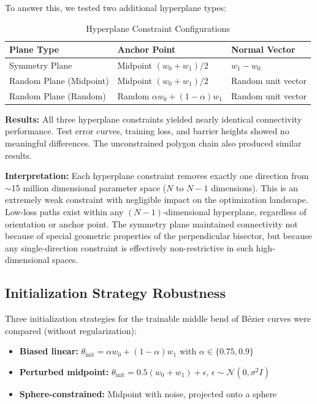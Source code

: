 \documentclass[11pt,a4paper]{article}
\begin{document}
To answer this, we tested two additional hyperplane types:

\begin{table}[H]
\centering
\caption{Hyperplane Constraint Configurations}
\begin{tabular}{lll}
\toprule
\textbf{Plane Type} & \textbf{Anchor Point} & \textbf{Normal Vector} \\
\midrule
Symmetry Plane & Midpoint $(w_0+w_1)/2$ & $w_1-w_0$ \\
Random Plane (Midpoint) & Midpoint $(w_0+w_1)/2$ & Random unit vector \\
Random Plane (Random) & Random $\alpha w_0+(1-\alpha)w_1$ & Random unit vector \\
\bottomrule
\end{tabular}
\end{table}

\textbf{Results:} All three hyperplane constraints yielded nearly identical connectivity performance. Test error curves, training loss, and barrier heights showed no meaningful differences. The unconstrained polygon chain also produced similar results.

\textbf{Interpretation:} Each hyperplane constraint removes exactly one direction from $\sim$15 million dimensional parameter space ($N$ to $N-1$ dimensions). This is an extremely weak constraint with negligible impact on the optimization landscape. Low-loss paths exist within any $(N-1)$-dimensional hyperplane, regardless of orientation or anchor point. The symmetry plane maintained connectivity not because of special geometric properties of the perpendicular bisector, but because any single-direction constraint is effectively non-restrictive in such high-dimensional spaces.

\subsection{Initialization Strategy Robustness}

Three initialization strategies for the trainable middle bend of B\'{e}zier curves were compared (without regularization):

\begin{itemize}
    \item \textbf{Biased linear:} $\theta_{\text{init}} = \alpha w_0 + (1-\alpha) w_1$ with $\alpha \in \{0.75, 0.9\}$
    \item \textbf{Perturbed midpoint:} $\theta_{\text{init}} = 0.5(w_0 + w_1) + \epsilon$, $\epsilon \sim \mathcal{N}(0, \sigma^2 I)$
    \item \textbf{Sphere-constrained:} Midpoint with noise, projected onto a sphere
\end{itemize}
\end{document}
